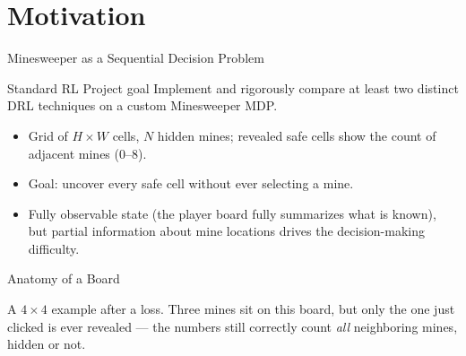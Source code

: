 
\section{Motivation}

\begin{frame}{Minesweeper as a Sequential Decision Problem}
  \begin{highlightbox}{Standard RL Project goal}
    Implement and rigorously compare at least two distinct DRL techniques
    on a custom Minesweeper MDP.
  \end{highlightbox}
  \begin{itemize}
    \item Grid of $H \times W$ cells, $N$ hidden mines; revealed safe cells
          show the count of adjacent mines ($0$–$8$).
    \item Goal: uncover every safe cell without ever selecting a mine.
    \item Fully observable state (the player board fully summarizes what is
          known), but \alert{partial information} about mine locations drives
          the decision-making difficulty.
  \end{itemize}
\end{frame}

\begin{frame}{Anatomy of a Board}
  \centering

  \vspace{0.35cm}
   \qquad
   \qquad

  \vspace{0.25cm}
  \small A $4\times4$ example after a loss. Three mines sit on this board,
  but only the one just clicked is ever revealed — the numbers still
  correctly count \emph{all} neighboring mines, hidden or not.
\end{frame}

